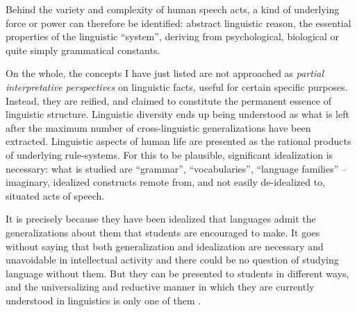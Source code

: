 \documentclass[output=paper]{langscibook}
\begin{document}
Behind the variety and complexity of human speech acts, a kind of underlying force or power can therefore be identified: abstract linguistic reason, the essential properties of the linguistic ``system'', deriving from psychological, biological or quite simply grammatical constants. 

On the whole, the concepts I have just listed are not approached as \emph{partial interpretative perspectives} on linguistic facts, useful for certain specific purposes. Instead, they are reified, and claimed to constitute the permanent essence of linguistic structure. Linguistic diversity ends up being understood as what is left after the maximum number of cross-linguistic generalizations have been extracted. Linguistic aspects of human life are presented as the rational products of underlying rule-systems. For this to be plausible, significant idealization is necessary: what is studied are ``grammar'', ``vocabularies'', ``language families'' – imaginary, idealized constructs remote from, and not easily de-idealized to, situated acts of speech.

It is precisely because they have been idealized that languages admit the generalizations about them that students are encouraged to make. It goes without saying that both generalization and idealization are necessary and unavoidable in intellectual activity and there could be no question of studying language without them. But they can be presented to students in different ways, and the universalizing and reductive manner in which they are currently understood in linguistics is only one of them \citep[cf.][]{StokhofLambalgen2011}.
\end{document}
